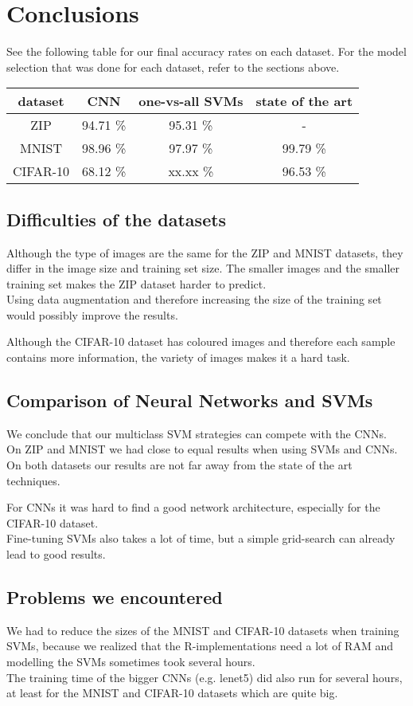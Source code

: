 
\section{Conclusions}

See the following table for our final accuracy rates on each dataset.
For the model selection that was done for each dataset, refer to the sections above.

\begin{tabular}{c|c|c|c}
 dataset & CNN & one-vs-all SVMs & state of the art \\ \hline
 ZIP & 94.71 \% & 95.31 \% & - \\
 MNIST & 98.96 \% & 97.97 \% & 99.79 \% \\
 CIFAR-10 & 68.12 \% & xx.xx \% & 96.53 \% \\
\end{tabular}


\subsection{Difficulties of the datasets}

Although the type of images are the same for the ZIP and MNIST datasets,
they differ in the image size and training set size.
The smaller images and the smaller training set makes the ZIP dataset harder to predict.\\
Using data augmentation and therefore increasing the size of the training set would possibly improve the results.

Although the CIFAR-10 dataset has coloured images and therefore each sample contains more information,
the variety of images makes it a hard task.


\subsection{Comparison of Neural Networks and SVMs}

We conclude that our multiclass SVM strategies can compete with the CNNs.\\
On ZIP and MNIST we had close to equal results when using SVMs and CNNs.\\
On both datasets our results are not far away from the state of the art techniques.

For CNNs it was hard to find a good network architecture, especially for the CIFAR-10 dataset.\\
Fine-tuning SVMs also takes a lot of time, but a simple grid-search can already lead to good results.

\subsection{Problems we encountered}

We had to reduce the sizes of the MNIST and CIFAR-10 datasets when training SVMs,
because we realized that the R-implementations need a lot of RAM
and modelling the SVMs sometimes took several hours.\\

The training time of the bigger CNNs (e.g. lenet5) did also run for several hours,
at least for the MNIST and CIFAR-10 datasets which are quite big.